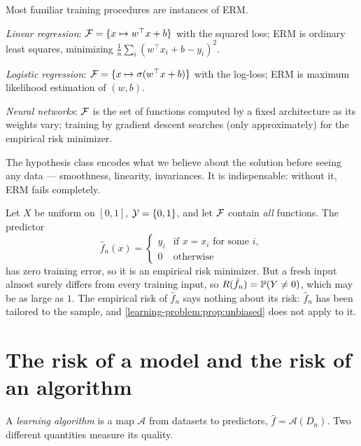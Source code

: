 \begin{notechapter}
Most familiar training procedures are instances of ERM.

\begin{example}
\emph{Linear regression}: $\mathcal{F} = \{x \mapsto w^\top x + b\}$ with the squared loss;
ERM is ordinary least squares, minimizing $\frac1n\sum_i (w^\top x_i + b - y_i)^2$.

\emph{Logistic regression}: $\mathcal{F} = \{x \mapsto \sigma(w^\top x + b)\}$ with the
log-loss; ERM is maximum likelihood estimation of $(w,b)$.

\emph{Neural networks}: $\mathcal{F}$ is the set of functions computed by a fixed
architecture as its weights vary; training by gradient descent searches (only
approximately) for the empirical risk minimizer.
\end{example}

The hypothesis class encodes what we believe about the solution before seeing
any data --- smoothness, linearity, invariances. It is indispensable: without
it, ERM fails completely.

\begin{pitfall}\label{erm:pit:memorizer}
Let $X$ be uniform on $[0,1]$, $\mathcal{Y}=\{0,1\}$, and let $\mathcal{F}$ contain \emph{all}
functions. The predictor
\[
  \hat f_n(x) = \begin{cases} y_i & \text{if } x = x_i \text{ for some } i,\\ 0 & \text{otherwise}\end{cases}
\]
has zero training error, so it is an empirical risk minimizer. But a fresh
input almost surely differs from every training input, so
$R(\hat f_n) = \mathbb{P}(Y \neq 0)$, which may be as large as $1$. The
empirical risk of $\hat f_n$ says nothing about its risk: $\hat f_n$ has been
tailored to the sample, and \cref{learning-problem:prop:unbiased} does not
apply to it.
\end{pitfall}

\section{The risk of a model and the risk of an algorithm}\label{erm:sec:model-vs-algorithm}

A \emph{learning algorithm} is a map $\mathcal A$ from datasets to predictors,
$\hat f = \mathcal A(D_n)$. Two different quantities measure its quality.


\end{notechapter}
